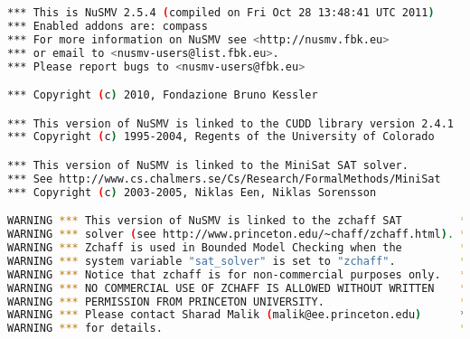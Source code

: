 \begin{lstlisting}[language=bash]
*** This is NuSMV 2.5.4 (compiled on Fri Oct 28 13:48:41 UTC 2011)
*** Enabled addons are: compass 
*** For more information on NuSMV see <http://nusmv.fbk.eu>
*** or email to <nusmv-users@list.fbk.eu>.
*** Please report bugs to <nusmv-users@fbk.eu>

*** Copyright (c) 2010, Fondazione Bruno Kessler

*** This version of NuSMV is linked to the CUDD library version 2.4.1
*** Copyright (c) 1995-2004, Regents of the University of Colorado

*** This version of NuSMV is linked to the MiniSat SAT solver. 
*** See http://www.cs.chalmers.se/Cs/Research/FormalMethods/MiniSat
*** Copyright (c) 2003-2005, Niklas Een, Niklas Sorensson 

WARNING *** This version of NuSMV is linked to the zchaff SAT         ***
WARNING *** solver (see http://www.princeton.edu/~chaff/zchaff.html). ***
WARNING *** Zchaff is used in Bounded Model Checking when the         ***
WARNING *** system variable "sat_solver" is set to "zchaff".          ***
WARNING *** Notice that zchaff is for non-commercial purposes only.   ***
WARNING *** NO COMMERCIAL USE OF ZCHAFF IS ALLOWED WITHOUT WRITTEN    ***
WARNING *** PERMISSION FROM PRINCETON UNIVERSITY.                     ***
WARNING *** Please contact Sharad Malik (malik@ee.princeton.edu)      ***
WARNING *** for details.                                              ***


\end{lstlisting}
